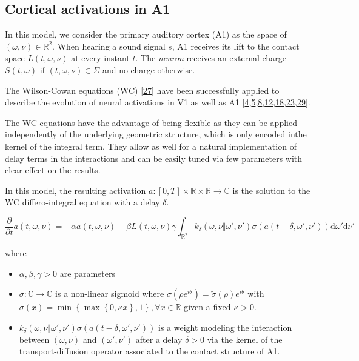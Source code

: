 \documentclass[american,]{article}
\providecommand{\tightlist}{%
  \setlength{\itemsep}{0pt}\setlength{\parskip}{0pt}}
\theoremstyle{definition}
\theoremstyle{definition}
\theoremstyle{definition}
\theoremstyle{remark}
\begin{document}
\hypertarget{cortical-activations-in-a1}{%
\subsection{Cortical activations in A1}\label{cortical-activations-in-a1}}

In this model, we consider the primary auditory cortex (A1) as the space of \((\omega,\nu)\in\mathbb{R}^2\).
When hearing a sound signal \(s\), A1 receives its lift to the contact space \(L(t,\omega,\nu)\)
at every instant \(t\).
The \emph{neuron} receives an external charge \(S(t,\omega)\) if \((t,\omega,\nu)\in\Sigma\) and no charge otherwise.

The Wilson-Cowan equations (WC) {[}\protect\hyperlink{ref-wilson1972}{27}{]} have been successfully applied to describe
the evolution of neural activations in V1 as well as A1
{[}\protect\hyperlink{ref-bertalmio2018}{4},\protect\hyperlink{ref-boscain2017}{5},\protect\hyperlink{ref-bressloff2002a}{8},\protect\hyperlink{ref-ermentrout1979}{12},\protect\hyperlink{ref-loebel2007}{18},\protect\hyperlink{ref-rankin2015}{23},\protect\hyperlink{ref-zulfiqar2019}{29}{]}.

The WC equations have the advantage of being flexible as they can be applied independently
of the underlying geometric structure, which is only encoded inthe kernel of the integral term.
They allow as well for a natural implementation of delay terms in the interactions
and can be easily tuned via few parameters with clear effect on the results.

In this model, the resulting activation \(a:[0,T]\times\mathbb{R}\times\mathbb{R}\rightarrow\mathbb{C}\) is the solution
to the WC differo-integral equation with a delay \(\delta\).

\begin{equation}
\frac{\partial}{\partial t}a(t,\omega,\nu) = -\alpha a(t,\omega,\nu) + \beta L(t,\omega,\nu)
\gamma\int_{\mathbb{R}^2} k_\delta(\omega,\nu\Vert\omega',\nu') \sigma(a(t-\delta,\omega',\nu')) \mathrm{d}\omega'\mathrm{d}\nu'
\end{equation}

where

\begin{itemize}
\tightlist
\item
  \(\alpha,\beta,\gamma>0\) are parameters
\item
  \(\sigma:\mathbb{C}\rightarrow\mathbb{C}\) is a non-linear sigmoid where \(\sigma(\rho e^{i\theta})=\tilde\sigma(\rho)e^{i\theta}\)
  with \(\tilde\sigma(x)=\min\left\{\max\left\{0,\kappa x\right\}, 1\right\},\forall x\in\mathbb{R}\) given a fixed \(\kappa>0\).
\item
  \(k_\delta(\omega,\nu\Vert\omega',\nu') \sigma(a(t-\delta,\omega',\nu'))\) is a weight modeling the interaction
  between \((\omega,\nu)\) and \((\omega',\nu')\) after a delay \(\delta>0\) via the kernel of the transport-diffusion
  operator associated to the contact structure of A1.
\end{itemize}
\end{document}
